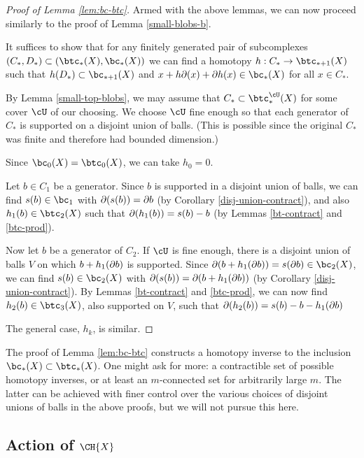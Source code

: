 \begin{proof}[Proof of Lemma \ref{lem:bc-btc}]
Armed with the above lemmas, we can now proceed similarly to the proof of Lemma \ref{small-blobs-b}.

It suffices to show that for any finitely generated pair of subcomplexes 
$(C_*, D_*) \sub (\btc_*(X), \bc_*(X))$
we can find a homotopy $h:C_*\to \btc_{*+1}(X)$ such that $h(D_*) \sub \bc_{*+1}(X)$
and $x + h\bd(x) + \bd h(x) \in \bc_*(X)$ for all $x\in C_*$.

By Lemma \ref{small-top-blobs}, we may assume that $C_* \sub \btc_*^\cU(X)$ for some
cover $\cU$ of our choosing.
We choose $\cU$ fine enough so that each generator of $C_*$ is supported on a disjoint union of balls.
(This is possible since the original $C_*$ was finite and therefore had bounded dimension.)

Since $\bc_0(X) = \btc_0(X)$, we can take $h_0 = 0$.

Let $b \in C_1$ be a generator.
Since $b$ is supported in a disjoint union of balls,
we can find $s(b)\in \bc_1$ with $\partial (s(b)) = \partial b$
(by Corollary \ref{disj-union-contract}), and also $h_1(b) \in \btc_2(X)$
such that $\partial (h_1(b)) = s(b) - b$
(by Lemmas \ref{bt-contract} and \ref{btc-prod}).

Now let $b$ be a generator of $C_2$.
If $\cU$ is fine enough, there is a disjoint union of balls $V$
on which $b + h_1(\partial b)$ is supported.
Since $\bd(b + h_1(\bd b)) = s(\bd b) \in \bc_2(X)$, we can find
$s(b)\in \bc_2(X)$ with $\partial(s(b)) = \partial(b + h_1(\partial b))$ (by Corollary \ref{disj-union-contract}).
By Lemmas \ref{bt-contract} and \ref{btc-prod}, we can now find
$h_2(b) \in \btc_3(X)$, also supported on $V$, such that $\partial(h_2(b)) = s(b) - b - h_1(\partial b)$

The general case, $h_k$, is similar.
\end{proof}

The proof of Lemma \ref{lem:bc-btc} constructs a homotopy inverse to the inclusion
$\bc_*(X)\sub \btc_*(X)$.
One might ask for more: a contractible set of possible homotopy inverses, or at least an
$m$-connected set for arbitrarily large $m$.
The latter can be achieved with finer control over the various
choices of disjoint unions of balls in the above proofs, but we will not pursue this here.




\subsection{Action of \texorpdfstring{$\CH{X}$}{C*(Homeo(M))}}
\label{ss:emap-def}

